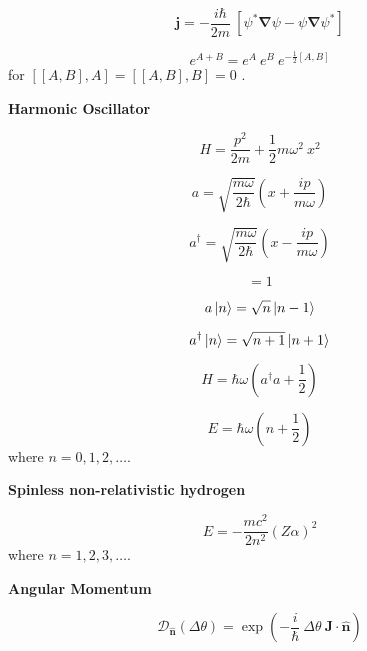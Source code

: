 \documentclass[11pt]{article}
\newcommand{\CurD}{\mathcal{D}}
\newcommand{\vect}[1]{\boldsymbol{\mathbf{#1}}}
\begin{document}
\begin{multicols}{2}
\begin{equation}
\vect{j} = - \frac{i \hbar}{2m} \: [\psi^* \vect{\nabla} \psi - \psi \vect{\nabla} \psi^*]
\end{equation}

\begin{equation}
e^{A+B}=e^A \: e^B \: e^{-\frac{1}{2}[A,B]}
\end{equation}
{\footnotesize for \( [[A,B],A]=[[A,B],B]=0 \) .}

\columnbreak

{\bf Harmonic Oscillator}

\begin{equation}
H = \frac{p^2}{2m} + \frac{1}{2} m \omega^2 \: x^2
\end{equation}

\begin{equation}
a = \sqrt{\frac{m\omega}{2\hbar}} \left( x+\frac{ip}{m\omega} \right)
\end{equation}

\begin{equation}
a^{\dagger} = \sqrt{\frac{m\omega}{2\hbar}} \left( x-\frac{ip}{m\omega} \right)
\end{equation}

\begin{equation}
[\:a, a^{\dagger}] = 1
\end{equation}

\begin{equation}
a \ket{n} = \sqrt{n} \ket{n-1}
\end{equation}

\begin{equation}
a^{\dagger} \ket{n} = \sqrt{n+1} \ket{n+1}
\end{equation}

\begin{equation}
H = \hbar\omega(a^{\dagger}a+\frac{1}{2})
\end{equation}

\begin{equation}
E = \hbar\omega(n+\frac{1}{2})
\end{equation}
where $n=0,1,2,\ldots$.

{\bf Spinless non-relativistic hydrogen}

\begin{equation}
E = - \frac{mc^2}{2n^2} (Z\alpha)^2
\end{equation}
where $n=1,2,3,\ldots$.

{\bf Angular Momentum}

\begin{equation}
\CurD_{\vect{\hat{n}}} (\Delta \theta )
  = \exp \left(-\frac{i}{\hbar} \: \Delta \theta \:
               \vect{J} \cdot \vect{\hat{n}} \right )
\end{equation}


\end{multicols}
\end{document}
